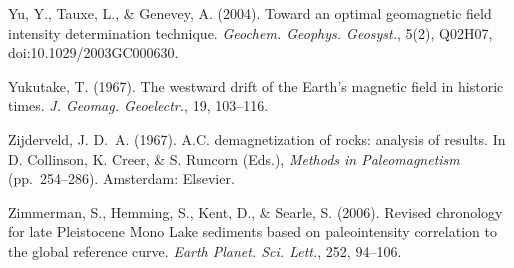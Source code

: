 \documentclass[,plain]{tauxe}
\begin{document}
\begin{thebibliography}{}
\bibitem{}%
Yu, Y., Tauxe, L., \& Genevey, A. (2004).
Toward an optimal geomagnetic field intensity determination technique.
{\it Geochem. Geophys. Geosyst.}, 5(2), Q02H07, doi:10.1029/2003GC000630.

\bibitem{}%
Yukutake, T. (1967).
The westward drift of the Earth's magnetic field in historic times.
{\it J. Geomag. Geoelectr.}, 19, 103--116.

\bibitem{}%
Zijderveld, J. D.~A. (1967).
A.C. demagnetization of rocks: analysis of results.
In D. Collinson, K. Creer, \& S. Runcorn (Eds.), {\it Methods in Paleomagnetism} (pp.\ 254--286). Amsterdam: Elsevier.

\bibitem{}%
Zimmerman, S., Hemming, S., Kent, D., \& Searle, S. (2006).
Revised chronology for late Pleistocene Mono Lake sediments based on paleointensity correlation to the global reference curve.
{\it Earth Planet. Sci. Lett.}, 252, 94--106.

\end{thebibliography}
\end{document}

